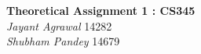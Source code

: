 \documentclass{article}
\begin{document}

\begin{center}
\textbf{\Large Theoretical Assignment 1 : CS345} \\
\textit{\large Jayant Agrawal}         14282 \\
\textit{\large Shubham Pandey}         14679
\end{center}
\end{document}
